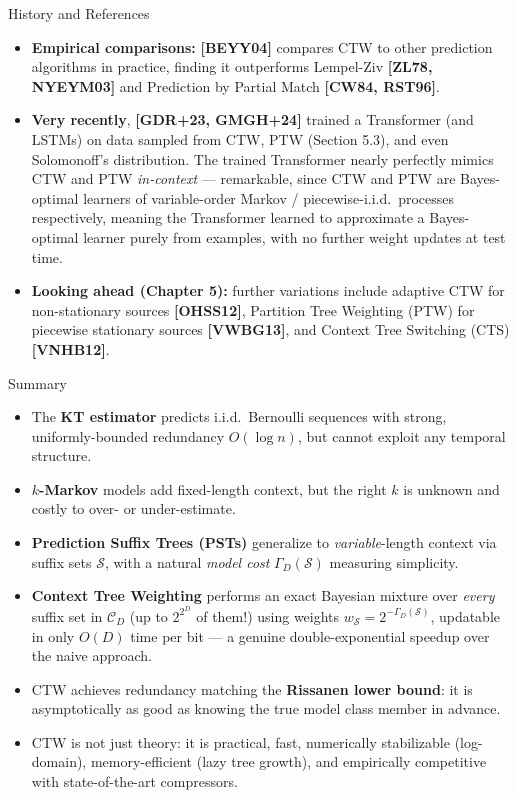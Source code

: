 \documentclass[aspectratio=169,10pt]{beamer}
\begin{document}
\begin{frame}[allowframebreaks]{History and References}
\begin{itemize}
\item \textbf{Empirical comparisons:} \textbf{[BEYY04]} compares CTW to other prediction
algorithms in practice, finding it outperforms Lempel-Ziv \textbf{[ZL78, NYEYM03]} and
Prediction by Partial Match \textbf{[CW84, RST96]}.
\item \textbf{Very recently}, \textbf{[GDR+23, GMGH+24]} trained a Transformer (and LSTMs)
on data sampled from CTW, PTW (Section 5.3), and even Solomonoff's distribution. The trained
Transformer nearly perfectly mimics CTW and PTW \emph{in-context} — remarkable, since CTW
and PTW are Bayes-optimal learners of variable-order Markov / piecewise-i.i.d.\ processes
respectively, meaning the Transformer learned to approximate a Bayes-optimal learner purely
from examples, with no further weight updates at test time.
\item \textbf{Looking ahead (Chapter 5):} further variations include adaptive CTW for
non-stationary sources \textbf{[OHSS12]}, Partition Tree Weighting (PTW) for piecewise
stationary sources \textbf{[VWBG13]}, and Context Tree Switching (CTS) \textbf{[VNHB12]}.
\end{itemize}
\end{frame}

\begin{frame}{Summary}
\begin{itemize}
\item The \textbf{KT estimator} predicts i.i.d.\ Bernoulli sequences with strong,
uniformly-bounded redundancy $O(\log n)$, but cannot exploit any temporal structure.
\item \textbf{$k$-Markov} models add fixed-length context, but the right $k$ is unknown and
costly to over- or under-estimate.
\item \textbf{Prediction Suffix Trees (PSTs)} generalize to \emph{variable}-length context
via suffix sets $\mathcal S$, with a natural \emph{model cost} $\Gamma_D(\mathcal S)$
measuring simplicity.
\item \textbf{Context Tree Weighting} performs an exact Bayesian mixture over \emph{every}
suffix set in $\mathcal C_D$ (up to $2^{2^D}$ of them!) using weights
$w_{\mathcal S}=2^{-\Gamma_D(\mathcal S)}$, updatable in only $O(D)$ time per bit — a genuine
double-exponential speedup over the naive approach.
\item CTW achieves redundancy matching the \textbf{Rissanen lower bound}: it is
asymptotically as good as knowing the true model class member in advance.
\item CTW is not just theory: it is practical, fast, numerically stabilizable (log-domain),
memory-efficient (lazy tree growth), and empirically competitive with state-of-the-art
compressors.
\end{itemize}
\end{frame}
\end{document}
